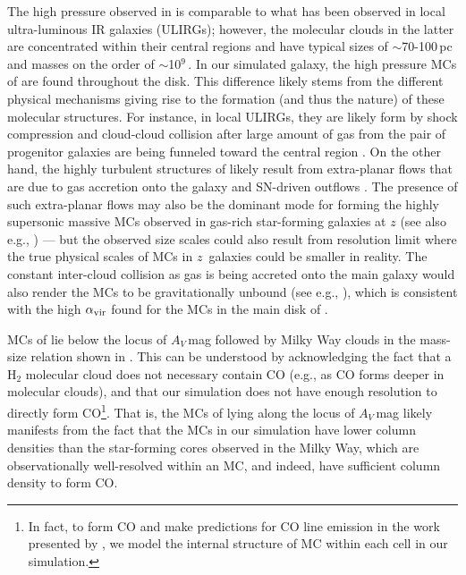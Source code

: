 \IfFileExists{emulateapjlegacy.cls}{\documentclass[iop]{emulateapjlegacy}}{\documentclass[iop]{emulateapj}}
\begin{document}
The high pressure observed in \flower is comparable to what has been observed in local ultra-luminous IR galaxies (ULIRGs); however, the molecular clouds in the latter are concentrated within their central regions and have typical sizes of $\sim$70-100\,pc and masses on the order of $\sim$10$^9$\,\Msun \citep{Downes98a, Sakamoto08a}. In our simulated galaxy, the high pressure MCs of \flower are found throughout the disk. This difference likely stems from the different physical mechanisms giving rise to the formation (and thus the nature) of these molecular structures.
%
For instance, in local ULIRGs, they are likely form by shock compression and cloud-cloud collision after large amount of gas from the pair of progenitor galaxies are being funneled toward the central region \citep{Tan00a, Wu18a}.
On the other hand, the highly turbulent structures of \flower likely result from 
extra-planar flows that are due to gas accretion onto the galaxy and SN-driven outflows \citep{gallerani:2018,kohandel:2019}.
The presence of such extra-planar flows may also be the 
dominant mode for forming the highly supersonic massive MCs observed in gas-rich star-forming galaxies at $z$ (see also e.g., \citealt{Swinbank11a}) --- but the observed size scales could also result from resolution limit where the true physical scales of MCs in $z$\, galaxies could be smaller in reality.
%
The constant inter-cloud collision as gas is being accreted onto the main galaxy would also render
the MCs to be gravitationally unbound (see e.g., \citealt{Dobbs11a}), which is
consistent with the high $\alpha_{\rm vir}$ found for the MCs in the main disk of \flower.

MCs of \flower lie below the locus of $A_V$\,mag followed by Milky Way clouds in the mass-size relation shown in . This can be understood by acknowledging the fact that a H$_2$ molecular cloud does not necessary contain CO (e.g., as CO forms deeper in molecular clouds), and that our simulation does not have enough resolution to directly form CO\footnote{In fact, to form CO and make predictions for CO line emission in the work presented by \citet{Vallini18a}, we model the internal structure of MC within each cell in our simulation.}.
%
That is, the MCs of \flower lying along the locus of $A_V$\,mag likely manifests from the fact that the MCs in our simulation have lower column densities than the star-forming cores observed in the Milky Way, which are observationally well-resolved within an MC, and indeed, have sufficient column density to form CO.
\end{document}
